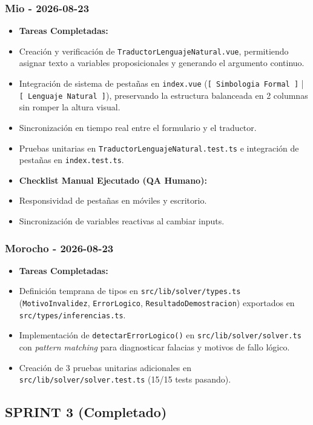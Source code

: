 \documentclass[11pt,a4paper,openany]{book}
\begin{document}
\subsubsection{Mio - 2026-08-23}
\begin{itemize}[leftmargin=*]
\item \textbf{Tareas Completadas:}
\item Creación y verificación de \texttt{TraductorLenguajeNatural.vue}, permitiendo asignar texto a variables proposicionales y generando el argumento continuo.
\item Integración de sistema de pestañas en \texttt{index.vue} (\texttt{[  Simbologia Formal ]} | \texttt{[  Lenguaje Natural ]}), preservando la estructura balanceada en 2 columnas sin romper la altura visual.
\item Sincronización en tiempo real entre el formulario y el traductor.
\item Pruebas unitarias en \texttt{TraductorLenguajeNatural.test.ts} e integración de pestañas en \texttt{index.test.ts}.
\item \textbf{Checklist Manual Ejecutado (QA Humano):}
\item [x] Responsividad de pestañas en móviles y escritorio.
\item [x] Sincronización de variables reactivas al cambiar inputs.
\end{itemize}

\subsubsection{Morocho - 2026-08-23}
\begin{itemize}[leftmargin=*]
\item \textbf{Tareas Completadas:}
\item Definición temprana de tipos en \texttt{src/lib/solver/types.ts} (\texttt{MotivoInvalidez}, \texttt{ErrorLogico}, \texttt{ResultadoDemostracion}) exportados en \texttt{src/types/inferencias.ts}.
\item Implementación de \texttt{detectarErrorLogico()} en \texttt{src/lib/solver/solver.ts} con \textit{pattern matching} para diagnosticar falacias y motivos de fallo lógico.
\item Creación de 3 pruebas unitarias adicionales en \texttt{src/lib/solver/solver.test.ts} (15/15 tests pasando).
\end{itemize}

\hrulefill

\subsection{SPRINT 3 (Completado)}
\end{document}
